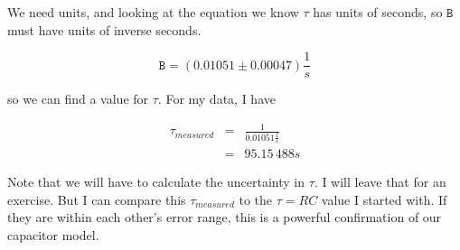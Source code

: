 We need units, and looking at the equation we know $\tau $ has units of seconds, so $\mathtt{B}$ must have units of inverse seconds.

\begin{equation*}
	\mathtt{B}=\left( 0.01051\pm 0.00047\right) \frac{1}{\unit{s}}
\end{equation*}

\noindent so we can find a value for $\tau .$ For my data, I have 

\begin{eqnarray*}
	\tau _{measured} &=&\frac{1}{ 0.01051\frac{1}{\unit{s}}} \\
	&=&95.15\,\allowbreak 488\unit{s}
\end{eqnarray*}

Note that we will have to calculate the uncertainty in $\tau .$ I will leave that for an exercise. But I can compare this $\tau _{measured}$ to the $\tau=RC$ value I started with. If they are within each other's error range, this is a powerful confirmation of our capacitor model.


